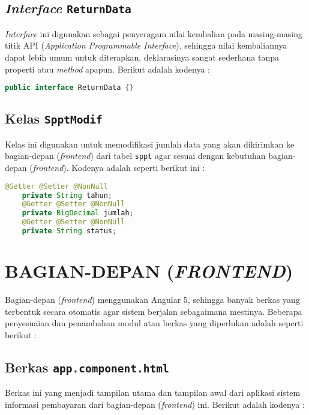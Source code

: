 \documentclass[pdftex,12pt, oneside]{article}
\begin{document}
\subsection{\textit{Interface} \texttt{ReturnData}}

\textit{Interface} ini digunakan sebagai penyeragam nilai kembalian pada masing-masing titik API (\textit{Application Programmable Interface}), sehingga nilai kembaliannya dapat lebih umum untuk diterapkan, deklarasinya sangat sederhana tanpa properti atau \textit{method} apapun. Berikut adalah kodenya :

\begin{lstlisting}[language=java]
public interface ReturnData {}
\end{lstlisting}

\subsection{Kelas \texttt{SpptModif}}

Kelas ini digunakan untuk memodifikasi jumlah data yang akan dikirimkan ke bagian-depan (\textit{frontend}) dari tabel \texttt{sppt} agar sesuai dengan kebutuhan bagian-depan (\textit{frontend}). Kodenya adalah seperti berikut ini :

\begin{lstlisting}[language=java]
    @Getter @Setter @NonNull
    private String tahun;
    @Getter @Setter @NonNull
    private BigDecimal jumlah;
    @Getter @Setter @NonNull
    private String status;
\end{lstlisting}

\section{BAGIAN-DEPAN (\textit{FRONTEND})}

Bagian-depan (\textit{frontend}) menggunakan Angular 5, sehingga banyak berkas yang terbentuk secara otomatis agar sistem berjalan sebagaimana mestinya. Beberapa penyesuaian dan penambahan modul atau berkas yang diperlukan adalah seperti berikut :

\subsection{Berkas \texttt{app.component.html}}

Berkas ini yang menjadi tampilan utama dan tampilan awal dari aplikasi sistem informasi pembayaran dari bagian-depan (\textit{frontend}) ini. Berikut adalah kodenya :
\end{document}
